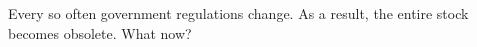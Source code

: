 \begin{exercise}
Every so often government regulations change. As a result, the entire
stock becomes obsolete. What now?

\end{exercise}












